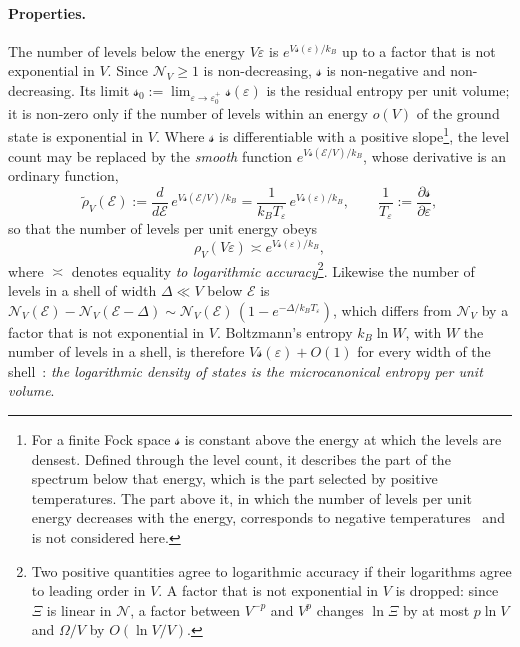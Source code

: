 \documentclass[10pt,a4paper]{article}
\theoremstyle{plain}
\newcommand{\cN}{\mathcal{N}}   %
\newcommand{\enrg}{\mathcal{E}}  %
\newcommand{\lds}{\mathscr{s}}  %
\begin{document}
\paragraph{Properties.} The number of levels below the energy $V\varepsilon$
is $e^{V\lds(\varepsilon)/k_B}$ up to a factor that is not exponential in
$V$. Since $\cN_V\ge1$ is non-decreasing, $\lds$ is non-negative and
non-decreasing. Its limit
$\lds_0:=\lim_{\varepsilon\to\varepsilon_0^{+}}\lds(\varepsilon)$ is the
residual entropy per unit volume; it is non-zero only if the number of levels
within an energy $o(V)$ of the ground state is exponential in $V$. Where
$\lds$ is differentiable with a positive slope\footnote{For a finite Fock
space $\lds$ is constant above the energy at which the levels are densest.
Defined through the level count, it describes the part of the spectrum
below that energy, which is the part selected by positive temperatures. The
part above it, in which the number of levels per unit energy decreases with
the energy, corresponds to negative temperatures~\cite{Baldovin2021} and is
not considered here.},
the level count may be replaced by the \emph{smooth} function
$e^{V\lds(\enrg/V)/k_B}$, whose derivative is an ordinary function,
\begin{equation}\label{eq:filt_rhosmooth}
  \tilde\rho_V(\enrg):=\frac{d}{d\enrg}\,e^{V\lds(\enrg/V)/k_B}
  =\frac{1}{k_BT_\varepsilon}\,e^{V\lds(\varepsilon)/k_B} ,
  \qquad
  \frac{1}{T_\varepsilon}:=\frac{\partial\lds}{\partial\varepsilon} ,
\end{equation}
so that the number of levels per unit energy obeys
\begin{equation}\label{eq:filt_rhos}
  \rho_V(V\varepsilon)\asymp e^{V\lds(\varepsilon)/k_B} ,
\end{equation}
where $\asymp$ denotes equality \emph{to logarithmic
accuracy}\footnote{\label{fn:logacc}Two positive quantities agree to
logarithmic accuracy if their logarithms agree to leading order in $V$. A
factor that is not exponential in $V$ is dropped: since $\Xi$ is linear in
$\cN$, a factor between $V^{-p}$ and $V^{p}$ changes $\ln\Xi$ by at most
$p\ln V$ and $\Omega/V$ by $O(\ln V/V)$.}. Likewise the number of levels in a
shell of width $\Delta\ll V$ below $\enrg$ is
$\cN_V(\enrg)-\cN_V(\enrg-\Delta) \sim \cN_V(\enrg)\,(1-e^{-\Delta/k_BT_\varepsilon})$,
which differs from $\cN_V$ by a factor that is not exponential in $V$.
Boltzmann's entropy $k_B\ln W$, with $W$ the number of levels in a shell, is
therefore $V\lds(\varepsilon)+O(1)$ for every width of the
shell~\cite[Sec.~2.3]{Schwabl}: \emph{the logarithmic density of states is the microcanonical
entropy per unit volume}.
\end{document}
